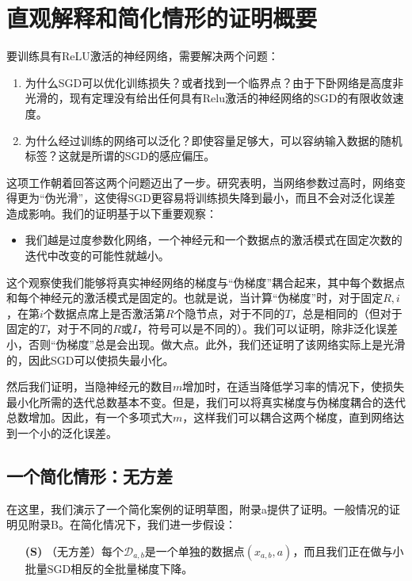 \section{直观解释和简化情形的证明概要}
要训练具有ReLU激活的神经网络，需要解决两个问题：
\begin{enumerate}
\item 为什么SGD可以优化训练损失？或者找到一个临界点？由于下卧网络是高度非光滑的，现有定理没有给出任何具有Relu激活的神经网络的SGD的有限收敛速度。
\item 为什么经过训练的网络可以泛化？即使容量足够大，可以容纳输入数据的随机标签？这就是所谓的SGD的感应偏压。
\end{enumerate}
\par
这项工作朝着回答这两个问题迈出了一步。研究表明，当网络参数过高时，网络变得更为“伪光滑”，这使得SGD更容易将训练损失降到最小，而且不会对泛化误差造成影响。我们的证明基于以下重要观察：
\begin{itemize}
  \item 我们越是过度参数化网络，一个神经元和一个数据点的激活模式在固定次数的迭代中改变的可能性就越小。
\end{itemize}
\par
这个观察使我们能够将真实神经网络的梯度与“伪梯度”耦合起来，其中每个数据点和每个神经元的激活模式是固定的。也就是说，当计算“伪梯度”时，对于固定$R,i$，在第$i$个数据点席上是否激活第$R$个隐节点，对于不同的$T$，总是相同的（但对于固定的$T$，对于不同的$R$或$I$，符号可以是不同的）。我们可以证明，除非泛化误差小，否则“伪梯度”总是会出现。做大点。此外，我们还证明了该网络实际上是光滑的，因此SGD可以使损失最小化。
\par
然后我们证明，当隐神经元的数目$m$增加时，在适当降低学习率的情况下，使损失最小化所需的迭代总数基本不变。但是，我们可以将真实梯度与伪梯度耦合的迭代总数增加。因此，有一个多项式大$m$，这样我们可以耦合这两个梯度，直到网络达到一个小的泛化误差。

\subsection{一个简化情形：无方差}
在这里，我们演示了一个简化案例的证明草图，附录a提供了证明。一般情况的证明见附录B。在简化情况下，我们进一步假设：
\begin{itemize}
\item[\textbf{(S)}]（无方差）每个$\mathcal{D}_{a,b}$是一个单独的数据点$(x_{a,b},a)$，而且我们正在做与小批量SGD相反的全批量梯度下降。
\end{itemize}

